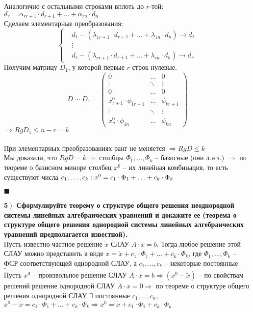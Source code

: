 \documentclass[a4paper,12pt]{article}
\begin{document}
Аналогично с остальными строками вплоть до $r$-той:\\
$d_r=\alpha_{rr+1}\cdot d_{r+1}+\ldots+\alpha_{rn}\cdot d_n$\\
Сделаем элементарные преобразования:
\[\left\{
\begin{aligned}
&d_1-(\lambda_{1r+1}\cdot d_{r+1}+\ldots+\lambda_{1n}\cdot d_n)\rightarrow d_1\\
&\vdots\\
&d_r-(\lambda_{rr+1}\cdot d_{r+1}+\ldots+\lambda_{rn}\cdot d_n)\rightarrow d_r
\end{aligned}\right.
\]
Получим матрицу $D_1$, у которой первые $r$ строк нулевые.
\[
D\backsim D_1=\begin{pmatrix}
0&\ldots&0\\
\vdots&\ddots&\vdots\\
0&\ldots&0\\
x_{r+1}^0\cdot\phi_{1r+1}&\ldots&\phi_{kr+1}\\
\vdots&\ddots&\vdots\\
x_n^0\cdot\phi_{1n}&\ldots&\phi_{kn}
\end{pmatrix}
\]
$\Rightarrow RgD_1\leq n-r=k$\\
\\
При элементарных преобразованиях ранг не меняется $\Rightarrow RgD\leq k$\\
Мы доказали, что $RgD=k\Rightarrow$ столбцы $\Phi_1, \ldots, \Phi_k$ -- базисные (они л.н.з.) $\Rightarrow$ по теореме о базисном миноре столбец $x^0$ -- их линейная комбинация, то есть существуют числа $c_1, \ldots, c_k :\\ x^0=c_1\cdot\Phi_1+\ldots+c_k\cdot\Phi_k$
\begin{flushright}
	$\blacksquare$
\end{flushright}	
\textbf{5$\left.\right)$ Сформулируйте теорему о структуре общего решения неоднородной системы линейных алгебраических уравнений и докажите ее (теорема о структуре общего решения однородной системы линейных алгебраических уравнений предполагается известной).}\\
Пусть известно частное решение $\tilde x$ СЛАУ $A\cdot x=b$. Тогда любое решение этой СЛАУ можно представить в виде $x=\tilde x+c_1\cdot\Phi_1+\ldots+c_k\cdot\Phi_k$, где $\Phi_1,\ldots, \Phi_k$ -- ФСР соответствующей однородной СЛАУ, а $c_1, \ldots, c_k$ -- некоторые постоянные\\
$\square$\\
Пусть $x^0$ -- произвольное решение СЛАУ $A\cdot x=b\Rightarrow(x^0-\tilde x)$ -- по свойствам решений решение однородной СЛАУ $A\cdot x=0\Rightarrow$ по теореме о структуре общего решения однородной СЛАУ $\exists$ постоянные $c_1, \ldots, c_n,$\\$ x^0-\tilde x=c_1\cdot\Phi_1+\ldots+c_k\cdot\Phi_k\Rightarrow x^0=\tilde x+c_1\cdot\Phi_1+c_k\cdot\Phi_k$
\end{document}
